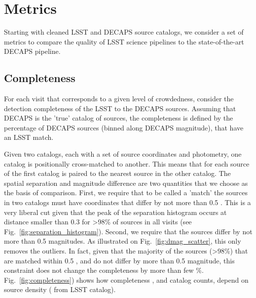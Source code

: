 \documentclass[DM,lsstdraft,toc,usenatbib]{lsstdoc}
\begin{document}
\section{Metrics}
\label{sec:metrics}

Starting with cleaned LSST and DECAPS source catalogs, we consider a set of metrics to compare the quality of LSST science pipelines to the  state-of-the-art DECAPS pipeline.  

\subsection{Completeness}

For each visit that corresponds to a given level of crowdedness, consider the detection completeness of the LSST to the DECAPS sources. Assuming that DECAPS is the 'true' catalog of sources, the completeness is defined by the percentage of DECAPS sources (binned along DECAPS magnitude), that have an LSST match. 

Given two catalogs, each with a set of  source coordinates and photometry,  one catalog is positionally cross-matched to another.  This means that for each source of the first catalog is paired to the nearest source in the other catalog. The spatial separation and magnitude difference are two quantities that we choose  as the basis of comparison.  First, we require that to be called a 'match' the sources in two catalogs must have coordinates that differ by not more than 0.5 \arcsec. This is a very liberal cut given that the peak of the separation histogram occurs at distance smaller than 0.3 \arcsec for >98\% of sources in all visits (see Fig.~\ref{fig:separation_histogram}).  Second,  we require that the sources differ by not more than 0.5 magnitudes. As illustrated on Fig.~\ref{fig:dmag_scatter}, this only removes the outliers.  In fact, given that the majority of the sources (>98\%) that are matched within 0.5 \arcsec, and do not differ by more than 0.5 magnitude, this constraint does not change the completeness by more than few \%.   Fig.~\ref{fig:completeness}) shows how completeness , and catalog counts, depend on source density ( from LSST catalog).  

\end{document}
